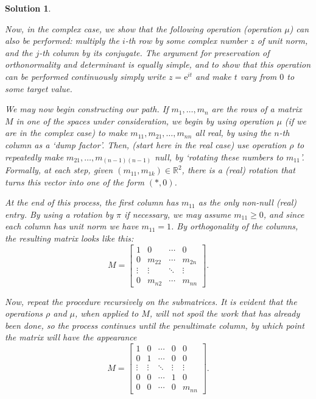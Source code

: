 \documentclass{article}
\theoremstyle{nonumberplain}
\newtheorem{sol}{Solution}
\newcommand{\R}{\mathbb{R}}
\newcommand{\e}{\mathrm{e}}
\begin{document}
\begin{sol}
\begin{enumerate}
Now, in the complex case, we show that the following operation (operation $\mu$) can also be performed: multiply the $i$-th row by some complex number $z$ of unit norm, and the $j$-th column by its conjugate. The argument for preservation of orthonormality and determinant is equally simple, and to show that this operation can be performed continuously simply write $z = \e^{i t}$ and make $t$ vary from $0$ to some target value.

We may now begin constructing our path. If $m_1, \dots, m_n$ are the rows of a matrix $M$ in one of the spaces under consideration, we begin by using operation $\mu$ (if we are in the complex case) to make $m_{11}, m_{21}, \dots, m_{nn}$ all real, by using the $n$-th column as a `dump factor'. Then, (start here in the real case) use operation $\rho$ to repeatedly make $m_{21}, \dots, m_{(n-1)(n-1)}$ null, by `rotating these numbers to $m_{11}$'. Formally, at each step, given $(m_{11},m_{1k}) \in \R^2$, there is a (real) rotation that turns this vector into one of the form $(*,0)$.

At the end of this process, the first column has $m_{11}$ as the only non-null (real) entry. By using a rotation by $\pi$ if necessary, we may assume $m_{11} \geq 0$, and since each column has unit norm we have $m_{11} = 1$. By orthogonality of the columns, the resulting matrix looks like this:
\begin{equation}
M = \begin{bmatrix}
1 & 0 & \cdots & 0\\
0 & m_{22} & \cdots & m_{2n} \\
\vdots & \vdots & \ddots & \vdots \\
0 & m_{n2} & \cdots & m_{nn}
\end{bmatrix}.
\end{equation}

Now, repeat the procedure recursively on the submatrices. It is evident that the operations $\rho$ and $\mu$, when applied to $M$, will not spoil the work that has already been done, so the process continues until the penultimate column, by which point the matrix will have the appearance
\begin{equation}
M = \begin{bmatrix}
1 & 0 & \cdots & 0 & 0\\
0 & 1 & \cdots & 0 & 0 \\
\vdots & \vdots & \ddots & \vdots & \vdots \\
0 & 0 & \cdots & 1 & 0 \\
0 & 0 & \cdots & 0 & m_{nn}
\end{bmatrix}.
\end{equation}


\end{enumerate}
\end{sol}
\end{document}
